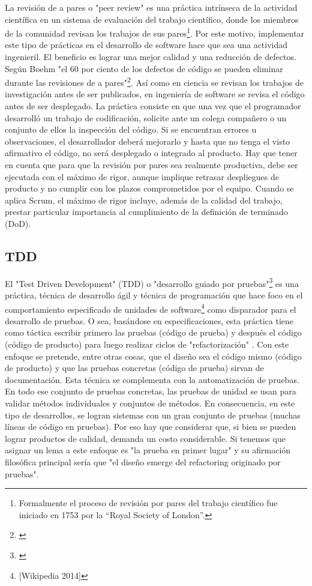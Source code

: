 La revisión de a pares o "peer review" es una práctica intrínseca de la actividad científica en un sistema de evaluación del trabajo científico, donde los miembros de la comunidad revisan los trabajos de sus pares\footnote{Formalmente el proceso de revisión por pares del trabajo científico fue iniciado en 1753 por la “Royal Society of London”.}. Por este motivo, implementar este tipo de prácticas en el desarrollo de software hace que sea una actividad ingenieril. El beneficio es lograr una mejor calidad y una reducción de defectos. Según Boehm "el 60 por ciento de los defectos de código se pueden eliminar durante las revisiones de a pares"\footnote{\cite{Boehm-2001}}. Así como en ciencia se revisan los trabajos de investigación antes de ser publicados, en ingeniería de software se revisa el código antes de ser desplegado.\newline
La práctica consiste en que una vez que el programador desarrolló un trabajo de codificación, solicite ante un colega compañero o un conjunto de ellos la inspección del código. Si se encuentran errores u observaciones, el desarrollador deberá mejorarlo y hasta que no tenga el visto afirmativo el código, no será desplegado o integrado al producto. Hay que tener en cuenta que para que la revisión por pares sea realmente productiva, debe ser ejecutada con el máximo de rigor, aunque implique retrasar despliegues de producto y no cumplir con los plazos comprometidos por el equipo. Cuando se aplica Scrum, el máximo de rigor incluye, además de la calidad del trabajo, prestar particular importancia al cumplimiento de la definición de terminado (DoD).

\subsection{TDD}

El "Test Driven Development" (TDD) o "desarrollo guiado por pruebas"\footnote{\cite{Jurado-2010}} es una práctica, técnica de desarrollo ágil y técnica de programación que hace foco en el comportamiento especificado de unidades de software\footnote{[Wikipedia 2014]} como disparador para el desarrollo de pruebas. O sea, basándose en especificaciones, esta práctica tiene como táctica escribir primero las pruebas (código de prueba) y después el código (código de producto) para luego realizar ciclos de "refactorización" \cite{Kent-Beck-2003}. Con este enfoque se pretende, entre otras cosas, que el diseño sea el código mismo (código de producto) y que las pruebas concretas (código de prueba) sirvan de documentación. Esta técnica se complementa con la automatización de pruebas. En todo ese conjunto de pruebas concretas, las pruebas de unidad se usan para validar métodos individuales y conjuntos de métodos. En consecuencia, en este tipo de desarrollos, se logran sistemas con un gran conjunto de pruebas (muchas líneas de código en pruebas). Por eso hay que considerar que, si bien se pueden lograr productos de calidad, demanda un costo considerable.\newline
Si tenemos que asignar un lema a este enfoque es "la prueba en primer lugar" y su afirmación filosófica principal sería que "el diseño emerge del refactoring originado por pruebas".

